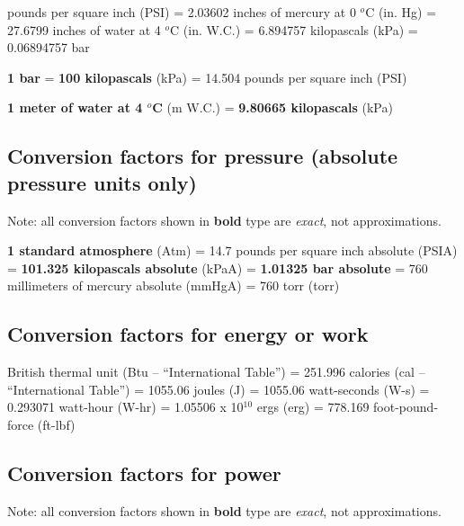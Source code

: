 \vskip 10pt

 pounds per square inch (PSI) = 2.03602 inches of mercury at 0 $^{o}$C (in. Hg) = 27.6799 inches of water at 4 $^{o}$C (in. W.C.) = 6.894757 kilopascals (kPa) = 0.06894757 bar

\vskip 10pt

\noindent 
\textbf{1 bar} = \textbf{100 kilopascals} (kPa) = 14.504 pounds per square inch (PSI)

\vskip 10pt

\noindent 
\textbf{1 meter of water at 4 $^{o}$C} (m W.C.) = \textbf{9.80665 kilopascals} (kPa)





\filbreak
\subsection{Conversion factors for pressure (absolute pressure units only)}

Note: all conversion factors shown in \textbf{bold} type are \textit{exact}, not approximations.

\vskip 10pt

\noindent 
\textbf{1 standard atmosphere} (Atm) = 14.7 pounds per square inch absolute (PSIA) = \textbf{101.325 kilopascals absolute} (kPaA) = \textbf{1.01325 bar absolute} = 760 millimeters of mercury absolute (mmHgA) = 760 torr (torr)





\filbreak
\subsection{Conversion factors for energy or work}

 British thermal unit (Btu -- ``International Table'') = 251.996 calories (cal -- ``International Table'') = 1055.06 joules (J) = 1055.06 watt-seconds (W-s) = 0.293071 watt-hour (W-hr) = 1.05506 x 10$^{10}$ ergs (erg) = 778.169 foot-pound-force (ft-lbf) 





\filbreak
\subsection{Conversion factors for power}

Note: all conversion factors shown in \textbf{bold} type are \textit{exact}, not approximations.

